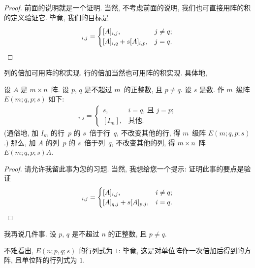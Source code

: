 \begin{proof}
    前面的说明就是一个证明.
    当然, 不考虑前面的说明, 我们也可直接用阵的积的定义验证它.
    毕竟, 我们的目标是
    \begin{equation*}
        [A E(n; p, q; s)]_{i,j}
        = \begin{cases}
            [A]_{i,j},              & j \neq q; \\
            [A]_{i,q} + s[A]_{i,p}, & j = q.
        \end{cases}
        \qedhere
    \end{equation*}
\end{proof}

列的倍加可用阵的积实现.
行的倍加当然也可用阵的积实现.
具体地,

\begin{theorem}
    设 \(A\) 是 \(m \times n\)~阵.
    设 \(p\), \(q\) 是不超过 \(m\)~的正整数,
    且 \(p \neq q\).
    设 \(s\) 是数.
    作 \(m\)~级阵 \(E(m; q, p; s)\) 如下:
    \begin{align*}
        [E(m; q, p; s)]_{i,j}
        = \begin{cases}
              s,     & \text{\(i = q\), 且 \(j = p\)}; \\
              [I_m], & \text{其他}.
          \end{cases}
    \end{align*}
    (通俗地,
    加 \(I_m\) 的行~\(p\) 的 \(s\)~倍于行~\(q\),
    不改变其他的行, 得 \(m\)~级阵 \(E(m; q, p; s)\).)
    那么,
    加 \(A\) 的列~\(p\) 的 \(s\)~倍于列~\(q\),
    不改变其他的列, 得 \(m \times n\)~阵 \(E(m; q, p; s) A\).
\end{theorem}

\begin{proof}
    请允许我留此事为您的习题.
    当然, 我想给您一个提示:
    证明此事的要点是验证
    \begin{equation*}
        [E(m; q, p; s) A]_{i,j}
        = \begin{cases}
            [A]_{i,j},              & i \neq q; \\
            [A]_{q,j} + s[A]_{p,j}, & i = q.
        \end{cases}
        \qedhere
    \end{equation*}
\end{proof}

我再说几件事.
设 \(p\), \(q\) 是不超过 \(n\) 的正整数,
且 \(p \neq q\).

不难看出, \(E(n; p, q; s)\) 的行列式为 \(1\):
毕竟, 这是对单位阵作一次倍加后得到的方阵,
且单位阵的行列式为 \(1\).

